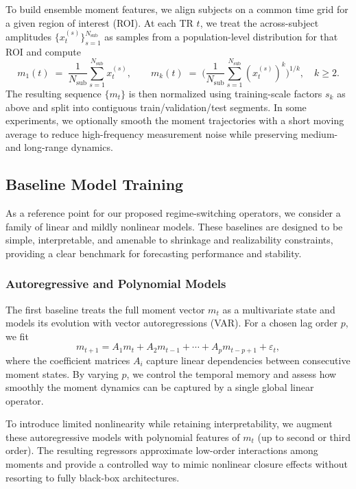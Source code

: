 \documentclass[journal, onecolumn]{IEEEtran}
\begin{document}
To build ensemble moment features, we align subjects on a common time grid for a
given region of interest (ROI). At each TR $t$, we treat the across-subject amplitudes
$\{x_t^{(s)}\}_{s=1}^{N_{\text{sub}}}$ as samples from a population-level distribution
for that ROI and compute
\[
m_1(t) \;=\; \frac{1}{N_{\text{sub}}} \sum_{s=1}^{N_{\text{sub}}} x_t^{(s)},
\qquad
m_k(t) \;=\; \Big( \frac{1}{N_{\text{sub}}} \sum_{s=1}^{N_{\text{sub}}} (x_t^{(s)})^k \Big)^{1/k},
\quad k \ge 2.
\]
The resulting sequence $\{m_t\}$ is then normalized using training-scale factors
$s_k$ as above and split into contiguous train/validation/test segments.
In some experiments, we optionally smooth the moment trajectories with a short
moving average to reduce high-frequency measurement noise while preserving
medium- and long-range dynamics.





\subsection{Baseline Model Training}

As a reference point for our proposed regime-switching operators, we consider a family of linear and mildly nonlinear models. These baselines are designed to be simple, interpretable, and amenable to shrinkage and realizability constraints, providing a clear benchmark for forecasting performance and stability.

\subsubsection{Autoregressive and Polynomial Models}

The first baseline treats the full moment vector $m_t$ as a multivariate state and models its evolution with vector autoregressions (VAR). For a chosen lag order $p$, we fit
\[
m_{t+1} = A_1 m_t + A_2 m_{t-1} + \cdots + A_p m_{t-p+1} + \varepsilon_t,
\]
where the coefficient matrices $A_i$ capture linear dependencies between consecutive moment states. By varying $p$, we control the temporal memory and assess how smoothly the moment dynamics can be captured by a single global linear operator.

To introduce limited nonlinearity while retaining interpretability, we augment these autoregressive models with polynomial features of $m_t$ (up to second or third order). The resulting regressors approximate low-order interactions among moments and provide a controlled way to mimic nonlinear closure effects without resorting to fully black-box architectures.
\end{document}
